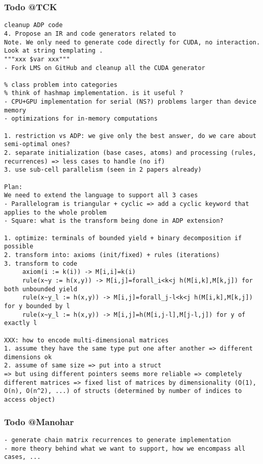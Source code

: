 \subsubsection*{Todo @TCK}
\begin{verbatim}
cleanup ADP code
4. Propose an IR and code generators related to
Note. We only need to generate code directly for CUDA, no interaction. Look at string templating .
"""xxx $var xxx"""
- Fork LMS on GitHub and cleanup all the CUDA generator

% class problem into categories
% think of hashmap implementation. is it useful ?
- CPU+GPU implementation for serial (NS?) problems larger than device memory
- optimizations for in-memory computations

1. restriction vs ADP: we give only the best answer, do we care about semi-optimal ones?
2. separate initialization (base cases, atoms) and processing (rules, recurrences) => less cases to handle (no if)
3. use sub-cell parallelism (seen in 2 papers already)

Plan:
We need to extend the language to support all 3 cases
- Parallelogram is triangular + cyclic => add a cyclic keyword that applies to the whole problem
- Square: what is the transform being done in ADP extension?

1. optimize: terminals of bounded yield + binary decomposition if possible
2. transform into: axioms (init/fixed) + rules (iterations)
3. transform to code
     axiom(i := k(i)) -> M[i,i]=k(i)
     rule(x~y := h(x,y)) -> M[i,j]=forall_i<k<j h(M[i,k],M[k,j]) for both unbounded yield
     rule(x~y_l := h(x,y)) -> M[i,j]=forall_j-l<k<j h(M[i,k],M[k,j]) for y bounded by l
     rule(x~y_l := h(x,y)) -> M[i,j]=h(M[i,j-l],M[j-l,j]) for y of exactly l

XXX: how to encode multi-dimensional matrices
1. assume they have the same type put one after another => different dimensions ok
2. assume of same size => put into a struct
=> but using different pointers seems more reliable => completely different matrices => fixed list of matrices by dimensionality (O(1), O(n), O(n^2), ...) of structs (determined by number of indices to access object)
\end{verbatim}

\subsubsection*{Todo @Manohar}
\begin{verbatim}
- generate chain matrix recurrences to generate implementation
- more theory behind what we want to support, how we encompass all cases, ...
\end{verbatim}

